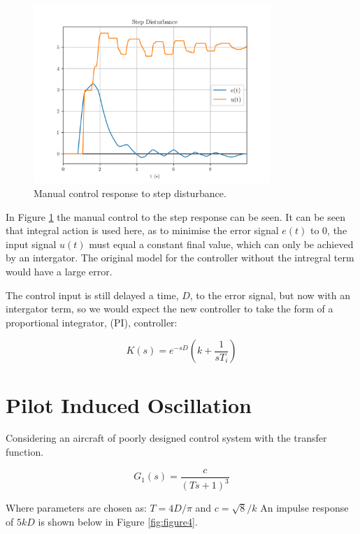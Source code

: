 \documentclass[8pt]{article}
\begin{document}
\begin{figure}[H]
    \centering
    \includegraphics[width=0.8\textwidth]{figures/FIGURE_3.png}
    \caption{Manual control response to step disturbance.}
    \label{fig:figure3}
\end{figure}

In Figure \ref{fig:figure3} the manual control to the step response can be seen. It can be seen that integral action is used here, as to minimise the error signal $e(t)$ to 0, the input signal $u(t)$ must equal a constant final value, which can only be achieved by an intergator.
The original model for the controller without the intregral term would have a large error.

The control input is still delayed a time, $D$, to the error signal, but now with an intergator term, so we would expect the new controller to take the form of a proportional integrator, (PI), controller:

\begin{equation}
    K(s) = e^{-sD}\left( k + \frac{1}{sT_i}\right)
\end{equation}

\section{Pilot Induced Oscillation}

Considering an aircraft of poorly designed control system with the transfer function.

\begin{equation}
    G_1(s) = \frac{c}{(Ts+1)^3}
\end{equation}

Where parameters are chosen as: $T=4D/\pi$ and $c=\sqrt{8}/k$
An impulse response of $5kD$ is shown below in Figure \ref{fig:figure4}.
\end{document}

